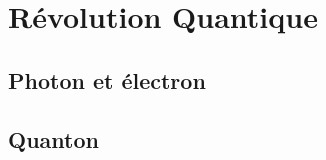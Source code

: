 \section{Révolution Quantique}
\subsection{Photon et électron}



\subsection{Quanton}



\subsection{}\subsection{}
\begin{center}
\end{center}

